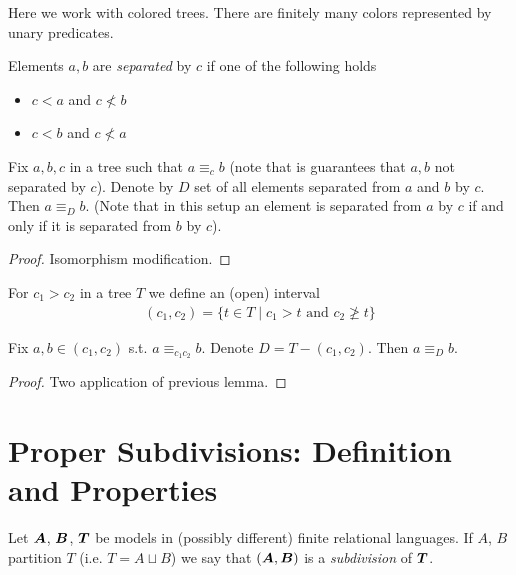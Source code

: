 \documentclass{amsart}
\DeclareMathOperator{\TT}{\boldface T}
\DeclareMathOperator{\A}{\boldface A}
\DeclareMathOperator{\B}{\boldface B}
\begin{document}
Here we work with colored trees. There are finitely many colors represented by unary predicates.

\begin{Definition}
	Elements $a,b$ are \textit{separated} by $c$ if one of the following holds
	\begin{itemize}
		\item $c < a$ and $c \nless b$
		\item $c < b$ and $c \nless a$
	\end{itemize}
\end{Definition}

\begin{Lemma}
	Fix $a,b,c$ in a tree such that $a \equiv_c b$ (note that is guarantees that $a,b$ not separated by $c$). Denote by $D$ set of all elements separated from $a$ and $b$ by $c$. Then $a \equiv_D b$. (Note that in this setup an element is separated from $a$ by $c$ if and only if it is separated from $b$ by $c$).
\end{Lemma}

\begin{proof}
	Isomorphism modification.
\end{proof}

\begin{Definition}
	For $c_1 > c_2$ in a tree $T$ we define an (open) interval
	\begin{align*}
		(c_1, c_2) = \{t \in T \mid c_1 > t \text{ and } c_2 \ngeq t\}
	\end{align*}
\end{Definition}

\begin{Corollary}
	Fix $a,b \in (c_1, c_2)$ s.t. $a \equiv_{c_1c_2} b$. Denote $D = T - (c_1, c_2)$. Then $a \equiv_D b$.
\end{Corollary}

\begin{proof}
	Two application of previous lemma.
\end{proof}


\section{Proper Subdivisions: Definition and Properties}

\begin{Definition}
	Let $\A$, $\B$, $\TT$ be models in (possibly different) finite relational languages. If $A$, $B$ partition $T$ (i.e. $T = A \sqcup B$) we say that $(\A, \B)$ is a \emph{subdivision} of $\TT$.
\end{Definition}
\end{document}
